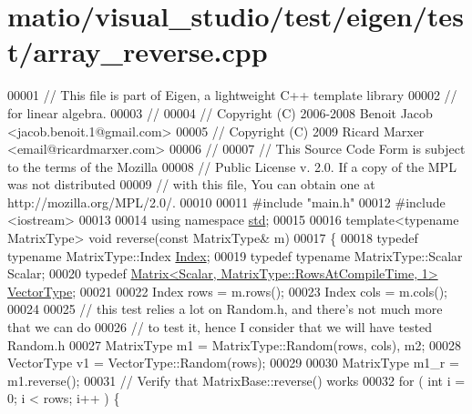 \hypertarget{matio_2visual__studio_2test_2eigen_2test_2array__reverse_8cpp_source}{}\section{matio/visual\+\_\+studio/test/eigen/test/array\+\_\+reverse.cpp}
\label{matio_2visual__studio_2test_2eigen_2test_2array__reverse_8cpp_source}

\begin{DoxyCode}
00001 \textcolor{comment}{// This file is part of Eigen, a lightweight C++ template library}
00002 \textcolor{comment}{// for linear algebra.}
00003 \textcolor{comment}{//}
00004 \textcolor{comment}{// Copyright (C) 2006-2008 Benoit Jacob <jacob.benoit.1@gmail.com>}
00005 \textcolor{comment}{// Copyright (C) 2009 Ricard Marxer <email@ricardmarxer.com>}
00006 \textcolor{comment}{//}
00007 \textcolor{comment}{// This Source Code Form is subject to the terms of the Mozilla}
00008 \textcolor{comment}{// Public License v. 2.0. If a copy of the MPL was not distributed}
00009 \textcolor{comment}{// with this file, You can obtain one at http://mozilla.org/MPL/2.0/.}
00010 
00011 \textcolor{preprocessor}{#include "main.h"}
00012 \textcolor{preprocessor}{#include <iostream>}
00013 
00014 \textcolor{keyword}{using namespace }\hyperlink{namespacestd}{std};
00015 
00016 \textcolor{keyword}{template}<\textcolor{keyword}{typename} MatrixType> \textcolor{keywordtype}{void} reverse(\textcolor{keyword}{const} MatrixType& m)
00017 \{
00018   \textcolor{keyword}{typedef} \textcolor{keyword}{typename} MatrixType::Index \hyperlink{namespace_eigen_a62e77e0933482dafde8fe197d9a2cfde}{Index};
00019   \textcolor{keyword}{typedef} \textcolor{keyword}{typename} MatrixType::Scalar Scalar;
00020   \textcolor{keyword}{typedef} \hyperlink{group___core___module_class_eigen_1_1_matrix}{Matrix<Scalar, MatrixType::RowsAtCompileTime, 1>} 
      \hyperlink{struct_vector_type}{VectorType};
00021 
00022   Index rows = m.rows();
00023   Index cols = m.cols();
00024 
00025   \textcolor{comment}{// this test relies a lot on Random.h, and there's not much more that we can do}
00026   \textcolor{comment}{// to test it, hence I consider that we will have tested Random.h}
00027   MatrixType m1 = MatrixType::Random(rows, cols), m2;
00028   VectorType v1 = VectorType::Random(rows);
00029 
00030   MatrixType m1\_r = m1.reverse();
00031   \textcolor{comment}{// Verify that MatrixBase::reverse() works}
00032   \textcolor{keywordflow}{for} ( \textcolor{keywordtype}{int} i = 0; i < rows; i++ ) \{

\end{DoxyCode}

